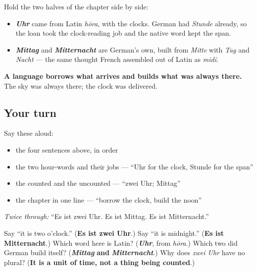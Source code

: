 \begin{culture}
Hold the two halves of the chapter side by side:

\begin{itemize}
\raggedright
  \item \emph{\textbf{Uhr}} came from Latin \emph{hōra}, with the clocks. German had \emph{Stunde} already, so the loan took the clock-reading job and the native word kept the span.
  \item \emph{\textbf{Mittag}} and \emph{\textbf{Mitternacht}} are German's own, built from \emph{Mitte} with \emph{Tag} and \emph{Nacht} — the same thought French assembled out of Latin as \emph{midi}.
\end{itemize}

\textbf{A language borrows what arrives and builds what was always there.} The sky was always there; the clock was delivered.
\end{culture}

\subsection*{Your turn}
Say these aloud:

\begin{itemize}
\raggedright
  \item the four sentences above, in order
  \item the two hour-words and their jobs — \textquotedblleft{}Uhr for the clock, Stunde for the span\textquotedblright{}
  \item the counted and the uncounted — \textquotedblleft{}zwei Uhr; Mittag\textquotedblright{}
  \item the chapter in one line — \textquotedblleft{}borrow the clock, build the noon\textquotedblright{}
\end{itemize}

\emph{Twice through:} \textquotedblleft{}Es ist zwei Uhr. Es ist Mittag. Es ist Mitternacht.\textquotedblright{}

\begin{tcolorbox}[breakable,colback=teal!4,colframe=teal!35!black,title={Before you move on}]
Say \textquotedblleft{}it is two o'clock.\textquotedblright{} (\textbf{Es ist zwei Uhr}.) Say \textquotedblleft{}it is midnight.\textquotedblright{} (\textbf{Es ist Mitternacht}.) Which word here is Latin? (\emph{\textbf{Uhr}}, from \emph{hōra}.) Which two did German build itself? (\emph{\textbf{Mittag}} \textbf{and} \emph{\textbf{Mitternacht}}.) Why does \emph{zwei Uhr} have no plural? (\textbf{It is a unit of time, not a thing being counted}.)
\end{tcolorbox}
